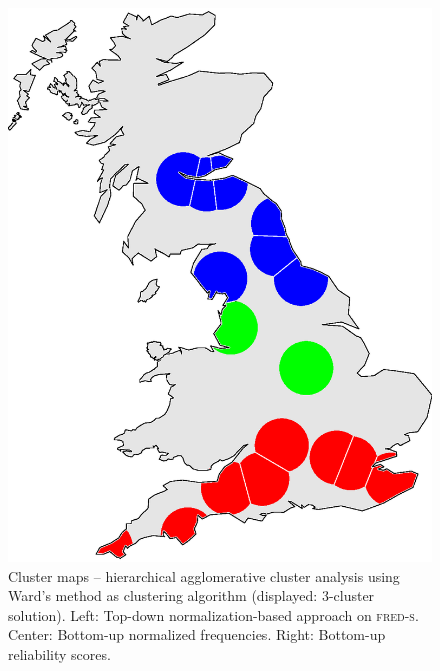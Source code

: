 \documentclass[output=paper]{LSP/langsci}
\begin{document}
\begin{figure}
\begin{minipage}[b]{0.30\linewidth}
    \includegraphics [keepaspectratio,width=.98\textwidth] {illustrations/wolk_noisy_cluster_reli7-3groups.eps}
\end{minipage}
\caption{Cluster maps -- hierarchical agglomerative cluster analysis using Ward's method as clustering algorithm (displayed: 3-cluster solution). Left: Top-down normalization-based approach on \textsc{fred-s}. Center: Bottom-up normalized frequencies. Right: Bottom-up reliability scores.} \label{fig:bup-maps}

\end{figure}
\end{document}
